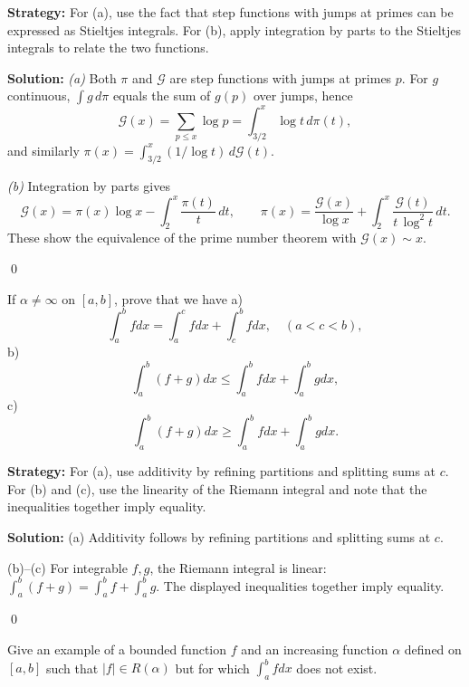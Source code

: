 \noindent\textbf{Strategy:} For (a), use the fact that step functions with jumps at primes can be expressed as Stieltjes integrals. For (b), apply integration by parts to the Stieltjes integrals to relate the two functions.

\bigskip\noindent\textbf{Solution:}
\textit{(a)} Both $\pi$ and $\mathcal{G}$ are step functions with jumps at primes $p$. For $g$ continuous, $\int g\,d\pi$ equals the sum of $g(p)$ over jumps, hence
\[\mathcal{G}(x)=\sum_{p\le x}\log p=\int_{3/2}^{x} \log t\,d\pi(t),\]
and similarly $\pi(x)=\int_{3/2}^{x} (1/\log t)\,d\mathcal{G}(t)$.

\textit{(b)} Integration by parts gives
\[\mathcal{G}(x)=\pi(x)\log x-\int_2^x \frac{\pi(t)}{t}\,dt,\qquad \pi(x)=\frac{\mathcal{G}(x)}{\log x}+\int_2^x \frac{\mathcal{G}(t)}{t\,\log^2 t}\,dt.
\]
These show the equivalence of the prime number theorem with $\mathcal{G}(x)\sim x$.




\qed
\begin{problembox}
\begin{problemstatement}
If $\alpha \neq \infty$ on $[a, b]$, prove that we have
a) \[\int_{a}^{b} f dx = \int_{a}^{c} f dx + \int_{c}^{b} f dx, \quad (a < c < b),\]
b) \[\int_{a}^{b} (f + g) dx \leq \int_{a}^{b} f dx + \int_{a}^{b} g dx,\]
c) \[\int_{a}^{b} (f + g) dx \geq \int_{a}^{b} f dx + \int_{a}^{b} g dx.\]
\end{problemstatement}
\end{problembox}

\noindent\textbf{Strategy:} For (a), use additivity by refining partitions and splitting sums at $c$. For (b) and (c), use the linearity of the Riemann integral and note that the inequalities together imply equality.

\bigskip\noindent\textbf{Solution:}
(a) Additivity follows by refining partitions and splitting sums at $c$.

(b)–(c) For integrable $f,g$, the Riemann integral is linear: $\int_a^b(f+g)=\int_a^b f+\int_a^b g$. The displayed inequalities together imply equality.




\qed
\begin{problembox}
\begin{problemstatement}
Give an example of a bounded function $f$ and an increasing function $\alpha$ defined on $[a, b]$ such that $|f| \in R(\alpha)$ but for which $\int_{a}^{b} f dx$ does not exist.
\end{problemstatement}
\end{problembox}

